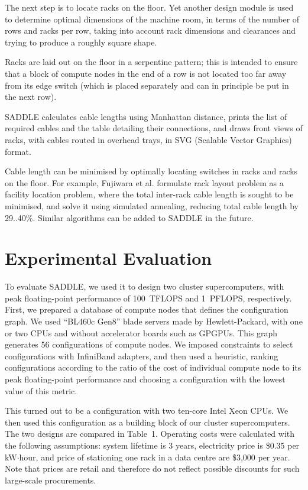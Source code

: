 \documentclass[runningheads,a4paper]{llncs}
\begin{document}
The next step is to locate racks on the floor. Yet another design module is used to determine optimal dimensions of the machine room, in terms of the number of rows and racks per row, taking into account rack dimensions and clearances and trying to produce a roughly square shape.

Racks are laid out on the floor in a serpentine pattern; this is intended to ensure that a block of compute nodes in the end of a row is not located too far away from its edge switch (which is placed separately and can in principle be put in the next row).

SADDLE calculates cable lengths using Manhattan distance, prints the list of required cables and the table detailing their connections, and draws front views of racks, with cables routed in overhead trays, in SVG (Scalable Vector Graphics) format.

Cable length can be minimised by optimally locating switches in racks and racks on the floor. For example, Fujiwara et al. \cite{fujiwara2012cabinet} formulate rack layout problem as a facility location problem, where the total inter-rack cable length is sought to be minimised, and solve it using simulated annealing, reducing total cable length by 29..40\%. Similar algorithms can be added to SADDLE in the future.


\section{Experimental Evaluation}
\label{section:Experimental-Evaluation}

To evaluate SADDLE, we used it to design two cluster supercomputers, with peak floating-point performance of 100~TFLOPS and 1~PFLOPS, respectively. First, we prepared a database of compute nodes that defines the configuration graph. We used ``BL460c Gen8'' blade servers made by Hewlett-Packard, with one or two CPUs and without accelerator boards such as GPGPUs. This graph generates 56 configurations of compute nodes. We imposed constraints to select configurations with InfiniBand adapters, and then used a heuristic, ranking configurations according to the ratio of the cost of individual compute node to its peak floating-point performance and choosing a configuration with the lowest value of this metric.

This turned out to be a configuration with two ten-core Intel Xeon CPUs. We then used this configuration as a building block of our cluster supercomputers. The two designs are compared in Table~1. Operating costs were calculated with the following assumptions: system lifetime is 3 years, electricity price is \$0.35 per kW$\cdot$hour, and price of stationing one rack in a data centre are \$3,000 per year. Note that prices are retail and therefore do not reflect possible discounts for such large-scale procurements.
\end{document}
